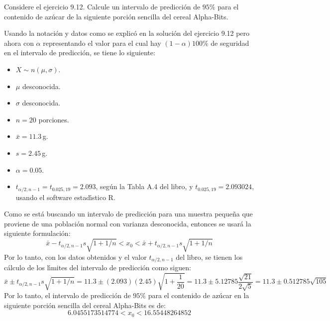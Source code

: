 \begin{enunciado}
 Considere el ejercicio 9.12. Calcule un intervalo de predicci\'on de $95\%$ para el contenido de az\'ucar de la siguiente porci\'on sencilla del cereal Alpha-Bits.
\end{enunciado}

\begin{solucion}
 Usando la notaci\'on y datos como se explic\'o en la soluci\'on del ejercicio 9.12 pero ahora con $\alpha$ representando el valor para el cual hay $(1-\alpha)100\%$ de seguridad en el intervalo de predicci\'on, se tiene lo siguiente:
 \begin{itemize}
  \item $X\sim n(\mu,\sigma)$.
  \item $\mu$ desconocida.
  \item $\sigma$ desconocida.
  \item $n = 20$ porciones.
  \item $\bar{x}=11.3\,$g.
  \item $s=2.45\,$g.
  \item $\alpha=0.05$.
  \item $t_{\alpha/2,n-1} = t_{0.025,19} = 2.093$, seg\'un la Tabla A.4 del libro, y $t_{0.025,19} = 2.093024$, usando el software estad\'{\i}stico R.
 \end{itemize}
 Como se est\'a buscando un intervalo de predicci\'on para una muestra peque\~na que proviene de una poblaci\'on normal con varianza desconocida, entonces se usar\'a la siguiente formulaci\'on:
 \begin{equation*}
  \bar{x} - t_{\alpha/2,n-1} s \sqrt{1 + 1/n} < x_0 < \bar{x} + t_{\alpha/2,n-1} s \sqrt{1 + 1/n}
 \end{equation*}
 Por lo tanto, con los datos obtenidos y el valor $t_{\alpha/2,n-1}$ del libro, se tienen los c\'alculo de los l\'{\i}mites del intervalo de predicci\'on como siguen:
 \begin{equation*}
  \bar{x} \pm t_{\alpha/2,n-1} s \sqrt{1 + 1/n} = 11.3 \pm (2.093)(2.45)\sqrt{1+\frac{1}{20}} = 11.3 \pm 5.12785 \frac{\sqrt{21}}{2\sqrt{5}} = 11.3\pm 0.512785\sqrt{105}
 \end{equation*}
 Por lo tanto, el intervalo de predicci\'on de $95\%$ para el contenido de az\'ucar en la siguiente porci\'on sencilla del cereal Alpha-Bits es de:
 \begin{equation*}
  6.0455173514774 < x_0 < 16.55448264852
 \end{equation*}

\end{solucion}
